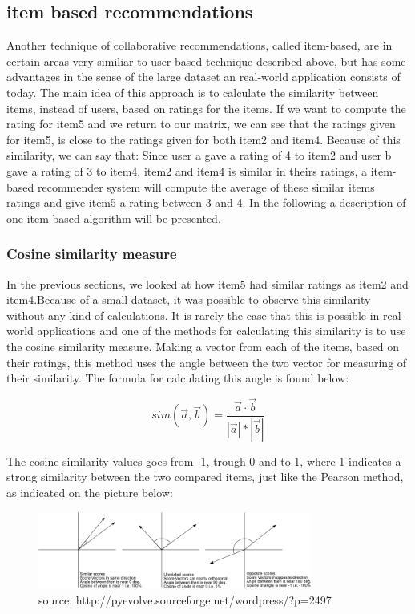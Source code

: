 
\subsection{item based recommendations} %
\label{sub:item_based_recommendations}
Another technique of collaborative recommendations, called item-based, are in certain areas very similiar to user-based technique described above, but has some advantages in the sense of the large dataset an real-world application consists of today. The main idea of this approach is to calculate the similarity between items, instead of users, based on ratings for the items. If we want to compute the rating for item5 and we return to our matrix, we can see that the ratings given for item5, is close to the ratings given for both item2 and item4. Because of this similarity, we can say that: Since user a gave a rating of 4 to item2 and user b gave a rating of 3 to item4, item2 and item4 is similar in theirs ratings, a item-based recommender system will compute the average of these similar items ratings and give item5 a rating between 3 and 4. 
In the following a description of one item-based algorithm will be presented. 

\subsubsection{Cosine similarity measure}
In the previous sections, we looked at how item5 had similar ratings as item2 and item4.Because of a small dataset, it was possible to observe this similarity without any kind of calculations. It is rarely the case that this is possible in real-world applications and one of the methods for calculating this similarity is to use the cosine similarity measure. Making a vector from each of the items, based on their ratings, this method uses the angle between the two vector for measuring of their similarity. The formula for calculating this angle is found below:

\[
	sim(\vec{a}, \vec{b}) = \frac{\vec{a} \cdot \vec{b}}{|\vec{a}| * |\vec{b}| }
\]


The cosine similarity values goes from -1, trough 0 and to 1, where 1 indicates a strong similarity between the two compared items, just like the Pearson method, as indicated on the picture below:

\begin{figure}[ht!]
\centering
\includegraphics[width=90mm]{Pictures/cosinesimilarity.png}
\caption{source: http://pyevolve.sourceforge.net/wordpress/?p=2497}
\label{cosinesimilarity}
\end{figure}

